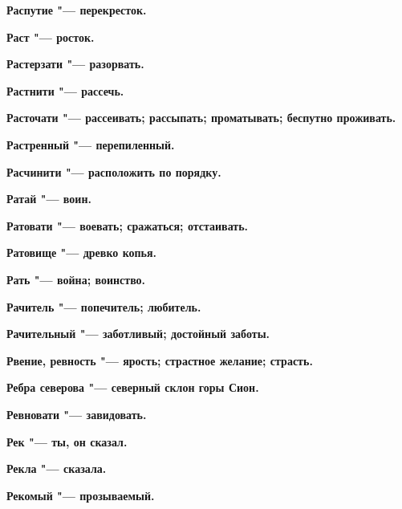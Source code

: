 \bfseries Распутие \normalfont{} "--- перекресток. 




\bfseries Раст \normalfont{} "--- росток. 




\bfseries Растерзати \normalfont{} "--- разорвать. 




\bfseries Растнити \normalfont{} "--- рассечь. 




\bfseries Расточати \normalfont{} "--- рассеивать; рассыпать; проматывать; беспутно проживать. 




\bfseries Растренный \normalfont{} "--- перепиленный. 




\bfseries Расчинити \normalfont{} "--- расположить по порядку. 




\bfseries Ратай \normalfont{} "--- воин. 




\bfseries Ратовати \normalfont{} "--- воевать; сражаться; отстаивать. 




\bfseries Ратовище \normalfont{} "--- древко копья. 




\bfseries Рать \normalfont{} "--- война; воинство. 




\bfseries Рачитель \normalfont{} "--- попечитель; любитель. 




\bfseries Рачительный \normalfont{} "--- заботливый; достойный заботы. 




\bfseries Рвение, ревность \normalfont{} "--- ярость; страстное желание; страсть. 




\bfseries Ребра северова \normalfont{} "--- северный склон горы Сион. 




\bfseries Ревновати \normalfont{} "--- завидовать. 




\bfseries Рек \normalfont{} "--- ты, он сказал. 




\bfseries Рекла \normalfont{} "--- сказала. 




\bfseries Рекомый \normalfont{} "--- прозываемый. 




